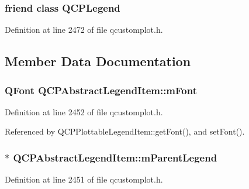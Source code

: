 \subsubsection[{Q\+C\+P\+Legend}]{\setlength{\rightskip}{0pt plus 5cm}friend class {\bf Q\+C\+P\+Legend}\hspace{0.3cm}{\ttfamily [friend]}}\label{class_q_c_p_abstract_legend_item_a8429035e7adfbd7f05805a6530ad5e3b}


Definition at line 2472 of file qcustomplot.\+h.



\subsection{Member Data Documentation}
\hypertarget{class_q_c_p_abstract_legend_item_ae916a78ac0d2a60e20a17ca2f24f9754}{}
\subsubsection[{m\+Font}]{\setlength{\rightskip}{0pt plus 5cm}Q\+Font Q\+C\+P\+Abstract\+Legend\+Item\+::m\+Font\hspace{0.3cm}{\ttfamily [protected]}}\label{class_q_c_p_abstract_legend_item_ae916a78ac0d2a60e20a17ca2f24f9754}


Definition at line 2452 of file qcustomplot.\+h.



Referenced by Q\+C\+P\+Plottable\+Legend\+Item\+::get\+Font(), and set\+Font().

\hypertarget{class_q_c_p_abstract_legend_item_aafcd9fc6fcb10f4a8d46037011afafe8}{}
\subsubsection[{m\+Parent\+Legend}]{$\ast$ Q\+C\+P\+Abstract\+Legend\+Item\+::m\+Parent\+Legend\hspace{0.3cm}{\ttfamily [protected]}}\label{class_q_c_p_abstract_legend_item_aafcd9fc6fcb10f4a8d46037011afafe8}


Definition at line 2451 of file qcustomplot.\+h.



